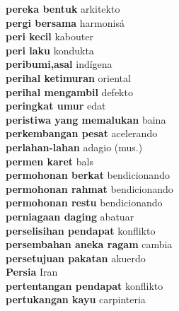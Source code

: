 \textbf{ pereka bentuk  } arkitekto \\
\textbf{ pergi bersama  } harmonisá \\
\textbf{ peri kecil  } kabouter \\
\textbf{ peri laku  } kondukta \\
\textbf{ peribumi,asal  } indígena \\
\textbf{ perihal ketimuran  } oriental \\
\textbf{ perihal mengambil  } defekto \\
\textbf{ peringkat umur  } edat \\
\textbf{ peristiwa yang memalukan  } baina \\
\textbf{ perkembangan pesat  } acelerando \\
\textbf{ perlahan-lahan  } adagio (mus.) \\
\textbf{ permen karet  } bals \\
\textbf{ permohonan berkat  } bendicionando \\
\textbf{ permohonan rahmat  } bendicionando \\
\textbf{ permohonan restu  } bendicionando \\
\textbf{ perniagaan daging  } abatuar \\
\textbf{ perselisihan pendapat  } konflikto \\
\textbf{ persembahan aneka ragam  } cambia \\
\textbf{ persetujuan pakatan  } akuerdo \\
\textbf{ Persia  } Iran \\
\textbf{ pertentangan pendapat  } konflikto \\
\textbf{ pertukangan kayu  } carpinteria \\
